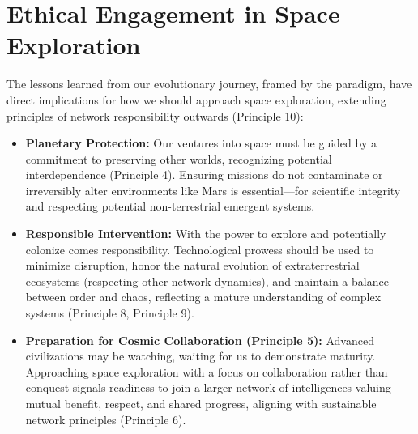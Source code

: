 \section{Ethical Engagement in Space Exploration}
The lessons learned from our evolutionary journey, framed by the paradigm, have direct implications for how we should approach space exploration, extending principles of network responsibility outwards (Principle 10):
\begin{itemize}
    \item \textbf{Planetary Protection:} Our ventures into space must be guided by a commitment to preserving other worlds, recognizing potential interdependence (Principle 4). Ensuring missions do not contaminate or irreversibly alter environments like Mars is essential—for scientific integrity and respecting potential non-terrestrial emergent systems.
    \item \textbf{Responsible Intervention:} With the power to explore and potentially colonize comes responsibility. Technological prowess should be used to minimize disruption, honor the natural evolution of extraterrestrial ecosystems (respecting other network dynamics), and maintain a balance between order and chaos, reflecting a mature understanding of complex systems (Principle 8, Principle 9).
    \item \textbf{Preparation for Cosmic Collaboration (Principle 5):} Advanced civilizations may be watching, waiting for us to demonstrate maturity. Approaching space exploration with a focus on collaboration rather than conquest signals readiness to join a larger network of intelligences valuing mutual benefit, respect, and shared progress, aligning with sustainable network principles (Principle 6).
\end{itemize} %

